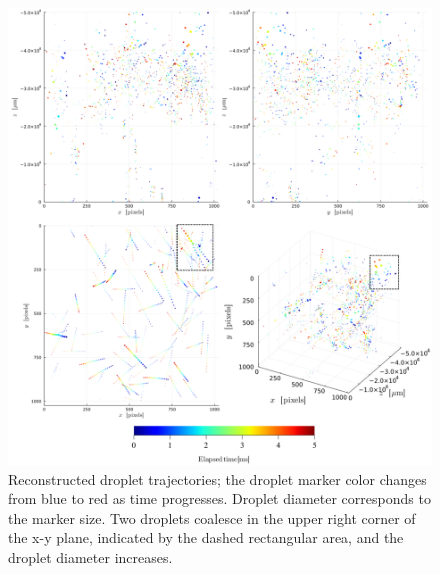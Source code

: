 \begin{figure}[H]
    \centering
    \includegraphics[width=1.00\linewidth]{./Figure/4_Results/exp/3dtraj.pdf}
    \caption{Reconstructed droplet trajectories; the droplet marker color changes from blue to red as time progresses. Droplet diameter corresponds to the marker size. Two droplets coalesce in the upper right corner of the x-y plane, indicated by the dashed rectangular area, and the droplet diameter increases.}
    \label{fig:3dtrajectory}
\end{figure}

